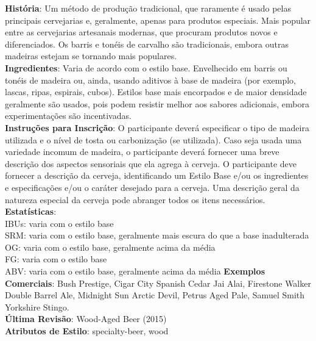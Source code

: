 \textbf{História}: Um método de produção tradicional, que raramente é usado pelas principais cervejarias e, geralmente, apenas para produtos especiais. Mais popular entre as cervejarias artesanais modernas, que procuram produtos novos e diferenciados. Os barris e tonéis de carvalho são tradicionais, embora outras madeiras estejam se tornando mais populares. \\
\textbf{Ingredientes}: Varia de acordo com o estilo base. Envelhecido em barris ou tonéis de madeira ou, ainda, usando aditivos à base de madeira (por exemplo, lascas, ripas, espirais, cubos). Estilos base mais encorpados e de maior densidade geralmente são usados, pois podem resistir melhor aos sabores adicionais, embora experimentações são incentivadas. \\
\textbf{Instruções para Inscrição}: O participante deverá especificar o tipo de madeira utilizada e o nível de tosta ou carbonização (se utilizada). Caso seja usada uma variedade incomum de madeira, o participante deverá fornecer uma breve descrição dos aspectos sensoriais que ela agrega à cerveja. O participante deve fornecer a descrição da cerveja, identificando um Estilo Base e/ou os ingredientes e especificações e/ou o caráter desejado para a cerveja. Uma descrição geral da natureza especial da cerveja pode abranger todos os itens necessários. \\
\textbf{Estatísticas}:\\
IBUs: varia com o estilo base\\
SRM: varia com o estilo base, geralmente mais escura do que a base inadulterada\\
OG: varia com o estilo base, geralmente acima da média\\
FG: varia com o estilo base\\
ABV: varia com o estilo base, geralmente acima da média
\textbf{Exemplos Comerciais}: Bush Prestige, Cigar City Spanish Cedar Jai Alai, Firestone Walker Double Barrel Ale, Midnight Sun Arctic Devil, Petrus Aged Pale, Samuel Smith Yorkshire Stingo. \\
\textbf{Última Revisão}: Wood-Aged Beer (2015) \\
\textbf{Atributos de Estilo}: specialty-beer, wood
